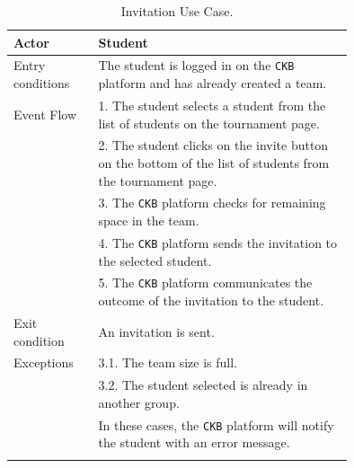 \begin{center}
    \begin{longtable}{lp{0.75\linewidth}}
        \hline
        Actor            & Student                                                                                                                                                                               \\
        \hline
        Entry conditions & The student is logged in on the \verb|CKB| platform and has already created a team.                                                                                                               \\
        \hline
        Event Flow       
        & 1. The student selects a student from the list of students on the tournament page.\\
        & 2. The student clicks on the invite button on the bottom of the list of students from the tournament page.\\
        & 3. The \verb|CKB| platform checks for remaining space in the team.\\
        & 4. The \verb|CKB| platform sends the invitation to the selected student.\\
        & 5. The \verb|CKB| platform communicates the outcome of the invitation to the student.\\
        \hline
        Exit condition   & An invitation is sent.   \\                                                                                                                                                                           
        \hline
        Exceptions   
        & 3.1. The team size is full.\\ 
        & 3.2. The student selected is already in another group.\\                                         
            & In these cases, the \verb|CKB| platform will notify the student with an error message.\\                                                               
        \hline
        \caption{Invitation Use Case.}
        \label{tab: invitation_use_case}
    \end{longtable}

\end{center}


